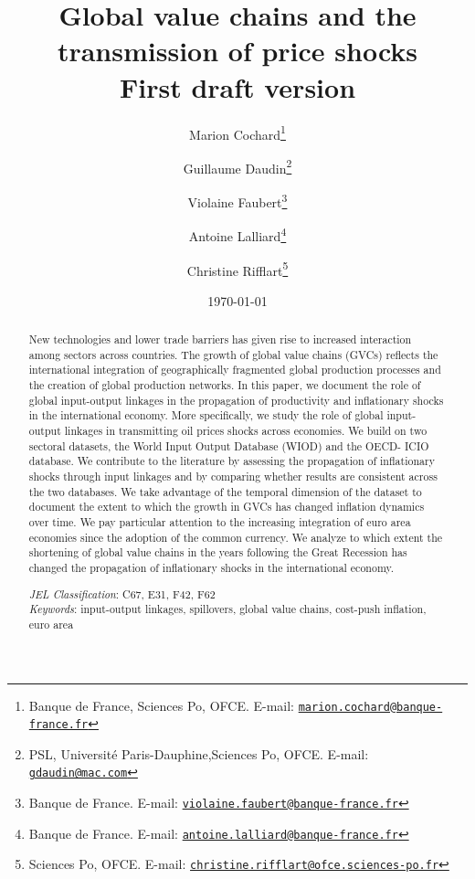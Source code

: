 \documentclass[11pt,a4paper]{article}
\newcommand{\email}[1]{\href{mailto:#1}{\nolinkurl{#1}}}
\begin{document}
\title{Global value chains and the transmission of price shocks\\
\vspace{1cm}
\normalsize{First draft version}
}
\vspace{1cm}

\date{\today}



\author{Marion Cochard\thanks{Banque de France, Sciences Po, OFCE. E-mail: \email{marion.cochard@banque-france.fr}}\and Guillaume Daudin\thanks{PSL, Universit\'e Paris-Dauphine,Sciences Po, OFCE. E-mail: \email{gdaudin@mac.com}}\and Violaine Faubert\thanks{Banque de France. E-mail: \email{violaine.faubert@banque-france.fr}} \and Antoine Lalliard\thanks{Banque de France. E-mail: \email{antoine.lalliard@banque-france.fr}} \and Christine Rifflart\thanks{Sciences Po, OFCE. E-mail: \email{christine.rifflart@ofce.sciences-po.fr}}
}



\maketitle

\begin{abstract}
{\small \noindent
New technologies and lower trade barriers has given rise to increased interaction among sectors across countries. The growth of global value chains (GVCs) reflects the international integration of geographically fragmented global production processes and the creation of global production networks.
In this paper, we document the role of global input-output linkages in the propagation of productivity and inflationary shocks in the international economy. 
More specifically, we study the role of global input-output linkages in transmitting oil prices shocks across economies.
We build on two sectoral datasets, the World Input Output Database (WIOD) and the OECD- ICIO database. We contribute to the literature by assessing the propagation of inflationary shocks through input linkages and by comparing whether results are consistent across the two databases. We take advantage of the temporal dimension of the dataset to document the extent to which the growth in GVCs has changed inflation dynamics over time. We pay particular attention to the increasing integration of euro area economies since the adoption of the common currency. We analyze to which extent the shortening of global value chains in the years following the Great Recession has changed the propagation of inflationary shocks in the international economy. 
}

{\small \bigskip \noindent \emph{JEL Classification}\/: C67, E31, F42, F62\\}
{\small \noindent \emph{Keywords}\/: input-output linkages, spillovers, global value chains, cost-push inflation, euro area \\}
\end{abstract}
\end{document}
